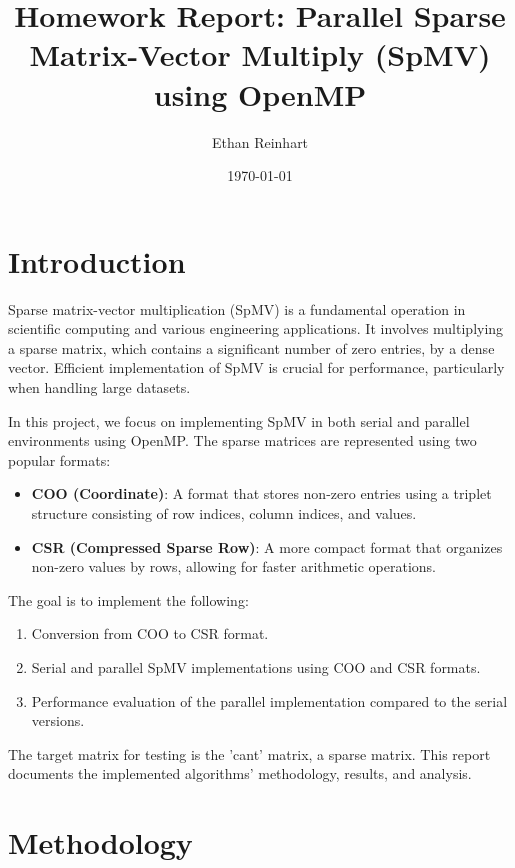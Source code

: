 \documentclass[12pt]{article}
\title{Homework Report: Parallel Sparse Matrix-Vector Multiply (SpMV) using OpenMP}
\author{Ethan Reinhart}
\date{\today}
\begin{document}
\maketitle

\tableofcontents
\newpage

\section{Introduction}
Sparse matrix-vector multiplication (SpMV) is a fundamental operation in scientific computing and various engineering applications. It involves multiplying a sparse matrix, which contains a significant number of zero entries, by a dense vector. Efficient implementation of SpMV is crucial for performance, particularly when handling large datasets.

In this project, we focus on implementing SpMV in both serial and parallel environments using OpenMP. The sparse matrices are represented using two popular formats:
\begin{itemize}
    \item \textbf{COO (Coordinate)}: A format that stores non-zero entries using a triplet structure consisting of row indices, column indices, and values.
    \item \textbf{CSR (Compressed Sparse Row)}: A more compact format that organizes non-zero values by rows, allowing for faster arithmetic operations.
\end{itemize}

The goal is to implement the following:
\begin{enumerate}
    \item Conversion from COO to CSR format.
    \item Serial and parallel SpMV implementations using COO and CSR formats.
    \item Performance evaluation of the parallel implementation compared to the serial versions.
\end{enumerate}

The target matrix for testing is the 'cant' matrix, a sparse matrix. This report documents the implemented algorithms' methodology, results, and analysis.

\section{Methodology}
\end{document}
